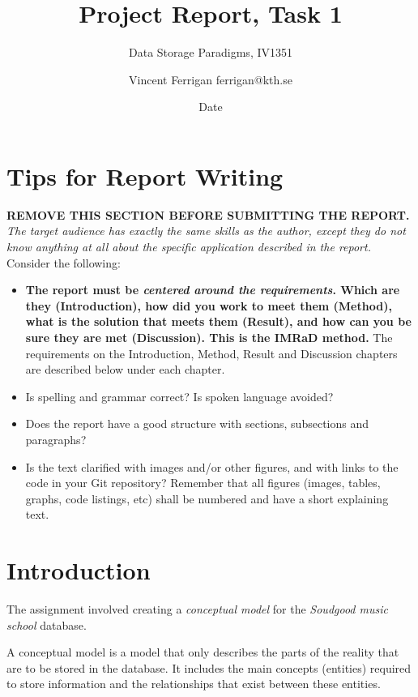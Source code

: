 \documentclass[a4paper]{scrartcl}
\title{Project Report, Task 1}
\subtitle{Data Storage Paradigms, IV1351}
\author{Vincent Ferrigan ferrigan@kth.se}
\date{Date}
\begin{document}
\maketitle
    
\section*{Tips for Report Writing}
\textbf{REMOVE THIS SECTION BEFORE SUBMITTING THE REPORT.}\\

\noindent \textit{The target audience has exactly the same skills as the author,
except they do not know anything at all about the specific application described
in the report.} \\

Consider the following:

\begin{itemize}
  \item \textbf{The report must be \textit{centered around the requirements}.
  Which are they (Introduction), how did you work to meet them (Method), what is
  the solution that meets them (Result), and how can you be sure they are met
  (Discussion). This is the IMRaD method.} The requirements on the Introduction,
  Method, Result and Discussion chapters are described below under each chapter.

  \item Is spelling and grammar correct? Is spoken language avoided?

  \item Does the report have a good structure with sections, subsections and
  paragraphs?

  \item Is the text clarified with images and/or other figures, and with links
  to the code in your Git repository? Remember that all figures (images, tables,
  graphs, code listings, etc) shall be numbered and have a short explaining
  text.
\end{itemize}

\section{Introduction}
The assignment involved creating a 
\emph{conceptual model} 
for the 
\emph{Soudgood music school} 
database. 

A conceptual model is a model that
only describes the parts of the reality that are to be stored in the
database.
It includes the main concepts (entities) required to store
information and the relationships that exist between these entities.
\end{document}
